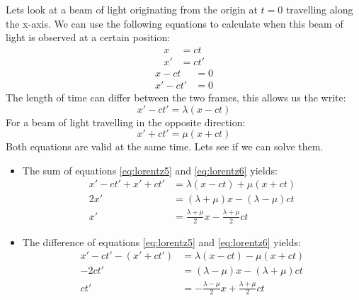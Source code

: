 Lets look at a beam of light originating from the origin at $t=0$ travelling along the x-axis. We can use the following equations to calculate when this beam of light is observed at a certain position:
\begin{equation}\label{eq:lorentz3}\begin{aligned}
x &= ct \\
x' &= ct'
\end{aligned}\end{equation}
\begin{equation}\label{eq:lorentz4}\begin{aligned}
x - ct &= 0 \\
x' - ct'&= 0
\end{aligned}\end{equation}
The length of time can differ between the two frames, this allows us the write:
\begin{equation}\label{eq:lorentz5}
x' - ct' = \lambda (x - ct)
\end{equation}
For a beam of light travelling in the opposite direction:
\begin{equation}\label{eq:lorentz6}
x' + ct' = \mu (x + ct)
\end{equation}
Both equations are valid at the same time. Lets see if we can solve them.
\begin{itemize}
\item The sum of equations \ref{eq:lorentz5} and \ref{eq:lorentz6} yields:
\begin{align}\label{eq:lorentz789}
x' - ct' + x' + ct' &= \lambda (x - ct) + \mu (x + ct) \\
2x' &= (\lambda + \mu)x - (\lambda - \mu)ct \\
x' &= \frac{\lambda + \mu}{2}x - \frac{\lambda + \mu}{2} ct
\end{align}

\item The difference of equations \ref{eq:lorentz5} and \ref{eq:lorentz6} yields:
\begin{align}\label{eq:lorentz101112}
x' - ct' - (x' + ct') &= \lambda (x - ct) - \mu (x + ct) \\
-2ct' &= (\lambda - \mu)x - (\lambda + \mu)ct \\
ct' &= -\frac{\lambda - \mu}{2}x + \frac{\lambda + \mu}{2} ct
\end{align}
\end{itemize}

